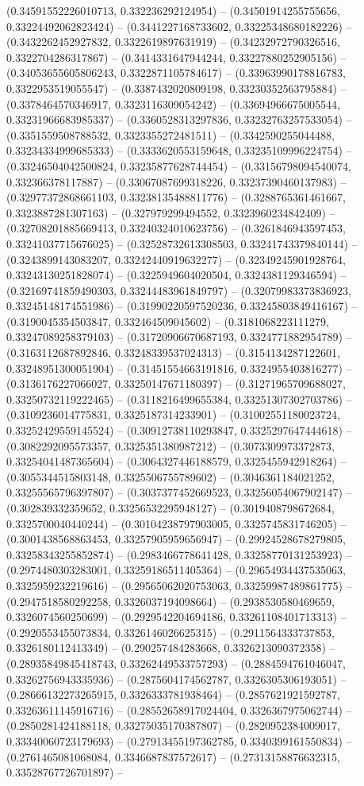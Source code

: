 (0.34591552226010713, 0.332236292124954) -- (0.34501914255755656, 0.33224492062823424) -- (0.3441227168733602, 0.33225348680182226) -- (0.3432262452927832, 0.3322619897631919) -- (0.34232972790326516, 0.3322704286317867) -- (0.3414331647944244, 0.33227880252905156) -- (0.34053655605806243, 0.3322871105784617) -- (0.33963990178816783, 0.3322953519055547) -- (0.3387432020809198, 0.33230352563795884) -- (0.3378464570346917, 0.3323116309054242) -- (0.33694966675005544, 0.33231966683985337) -- (0.3360528313297836, 0.33232763257533054) -- (0.3351559508788532, 0.3323355272481511) -- (0.3342590255044488, 0.33234334999685333) -- (0.3333620553159648, 0.33235109996224754) -- (0.33246504042500824, 0.33235877628744454) -- (0.33156798094540074, 0.332366378117887) -- (0.33067087699318226, 0.33237390460137983) -- (0.32977372868661103, 0.33238135488811776) -- (0.3288765361461667, 0.3323887281307163) -- (0.327979299494552, 0.3323960234842409) -- (0.32708201885669413, 0.33240324010623756) -- (0.3261846943597453, 0.33241037715676025) -- (0.32528732613308503, 0.33241743379840144) -- (0.3243899143083207, 0.33242440919632277) -- (0.32349245901928764, 0.33243130251828074) -- (0.3225949604020504, 0.3324381129346594) -- (0.32169741859490303, 0.33244483961849797) -- (0.32079983373836923, 0.33245148174551986) -- (0.31990220597520236, 0.33245803849416167) -- (0.3190045354503847, 0.332464509045602) -- (0.3181068223111279, 0.33247089258379103) -- (0.31720906670687193, 0.3324771882954789) -- (0.3163112687892846, 0.33248339537024313) -- (0.3154134287122601, 0.33248951300051904) -- (0.31451554663191816, 0.3324955403816277) -- (0.3136176227066027, 0.33250147671180397) -- (0.31271965709688027, 0.33250732119222465) -- (0.3118216499655384, 0.33251307302703786) -- (0.3109236014775831, 0.3325187314233901) -- (0.31002551180023724, 0.33252429559145524) -- (0.30912738110293847, 0.3325297647444618) -- (0.3082292095573357, 0.3325351380987212) -- (0.3073309973372873, 0.33254041487365604) -- (0.3064327446188579, 0.3325455942918264) -- (0.3055344515803148, 0.3325506755789602) -- (0.3046361184021252, 0.33255565796397807) -- (0.3037377452669523, 0.33256054067902147) -- (0.302839332359652, 0.33256532295948127) -- (0.3019408798672684, 0.3325700040440244) -- (0.30104238797903005, 0.3325745831746205) -- (0.3001438568863453, 0.33257905959656947) -- (0.29924528678279805, 0.33258343255852874) -- (0.2983466778641428, 0.33258770131253923) -- (0.2974480303283001, 0.33259186511405364) -- (0.29654934437535063, 0.3325959232219616) -- (0.29565062020753063, 0.33259987489861775) -- (0.2947518580292258, 0.3326037194098664) -- (0.2938530580469659, 0.3326074560250699) -- (0.2929542204694186, 0.33261108401713313) -- (0.2920553455073834, 0.3326146026625315) -- (0.2911564333737853, 0.3326180112413349) -- (0.290257484283668, 0.3326213090372358) -- (0.28935849845418743, 0.33262449533757293) -- (0.2884594761046047, 0.33262756943335936) -- (0.2875604174562787, 0.3326305306193051) -- (0.28666132273265915, 0.3326333781938464) -- (0.2857621921592787, 0.33263611145916716) -- (0.28552658917024404, 0.3326367975062744) -- (0.2850281424188118, 0.33275035170387807) -- (0.2820952384009017, 0.33340060723179693) -- (0.27913455197362785, 0.3340399161550834) -- (0.2761465081068084, 0.3346687837572617) -- (0.27313158876632315, 0.33528767726701897) -- 